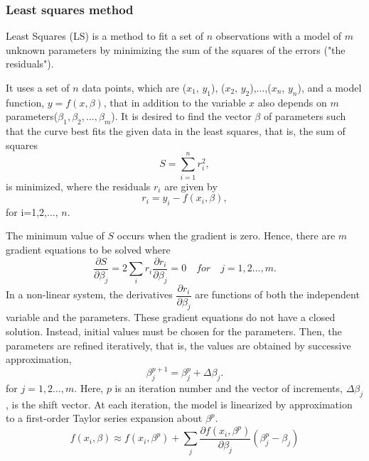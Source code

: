 \documentclass[journal]{IEEEtran}
\begin{document}
\subsubsection{\textbf{Least squares method}}
\par Least Squares (LS) is a method to fit a set of $n$ observations with a model of $m$ unknown parameters by minimizing the sum of the squares of the errors ("the residuals").
\par
It uses a set of $n$ data points, which are ($x_1$, $y_1$), ($x_2$, $y_2$),$\dots$,($x_n$, $y_n$), and a model function, $y= f(x, \beta)$, that in addition to the variable $x$ also depends on $m$ parameters($\beta_1,\beta_2,...,\beta_m$).
It is desired to find the vector $\beta$ of parameters such that the curve best fits the given data in the least squares, that is, the sum of squares
\begin{equation}
    S=\sum_{i=1}^{n}r_i^2 ,
\end{equation}
is minimized, where the residuals $r_i$ are given by
\begin{equation}
    r_i = y_i - f(x_i,\beta),
\end{equation}
for i=1,2,$\dots$, $n$.
\par
The minimum value of $S$ occurs when the gradient is zero. Hence, there are $m$ gradient equations to be solved where
\begin{equation}
    \dfrac{\partial S}{\partial \beta_j}=2\sum_i r_i\dfrac{\partial r_i}{\partial \beta_j}=0  \quad for \quad j=1,2...,m.
\end{equation}
In a non-linear system, the derivatives $\dfrac{\partial r_i}{\partial \beta_j}$ are functions of both the independent
variable and the parameters. These gradient equations do not have a closed solution. Instead, initial values must be chosen for the
parameters. Then, the parameters are refined iteratively, that is, the values are obtained by successive approximation,
\begin{equation}
    \beta_j^{p+1}=\beta^p_j+\Delta \beta_j.
\end{equation}
for $j=1,2...,m.$ Here, $p$ is an iteration number and the vector of increments, $\Delta \beta_j$, is the shift vector. At each iteration, the model is linearized by approximation to a first-order Taylor series expansion about $\beta^p$.
\begin{equation}
    f(x_i,\beta)\approx f(x_i,\beta^p) +\sum_j \dfrac{\partial f(x_i, \beta^p)}{\partial \beta_j} \left(\beta^p_j -\beta_j \right)
\end{equation}
\end{document}
